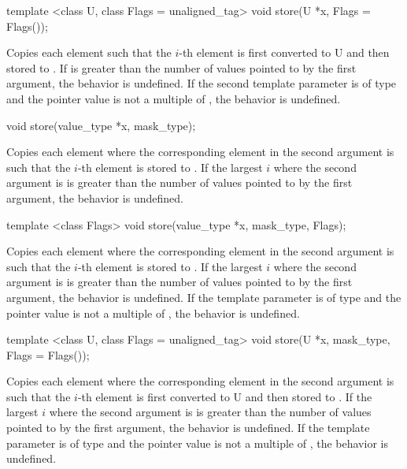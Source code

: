 \begin{wgText}
  \begin{itemdecl}
template <class U, class Flags = unaligned_tag> void store(U *x, Flags = Flags());
  \end{itemdecl}
  \begin{itemdescr}
    \pnum\effects Copies each element such that the $i$-th element is first converted to \type U and then stored to .
    \pnum\remarks If \datapar{} is greater than the number of values pointed to by the first argument, the behavior is undefined.
    \pnum\remarks If the second template parameter is of type  and the pointer value is not a multiple of , the behavior is undefined.
  \end{itemdescr}

  \begin{itemdecl}
void store(value_type *x, mask_type);
  \end{itemdecl}
  \begin{itemdescr}
    \pnum\effects Copies each element where the corresponding element in the second argument is \true such that the $i$-th element is stored to .
    \pnum\remarks If the largest $i$ where the second argument is \true is greater than the number of values pointed to by the first argument, the behavior is undefined.
  \end{itemdescr}

  \begin{itemdecl}
template <class Flags> void store(value_type *x, mask_type, Flags);
  \end{itemdecl}
  \begin{itemdescr}
    \pnum\effects Copies each element where the corresponding element in the second argument is \true such that the $i$-th element is stored to .
    \pnum\remarks If the largest $i$ where the second argument is \true is greater than the number of values pointed to by the first argument, the behavior is undefined.
    \pnum\remarks If the template parameter is of type  and the pointer value is not a multiple of , the behavior is undefined.
  \end{itemdescr}

  \begin{itemdecl}
template <class U, class Flags = unaligned_tag> void store(U *x, mask_type, Flags = Flags());
  \end{itemdecl}
  \begin{itemdescr}
    \pnum\effects Copies each element where the corresponding element in the second argument is \true such that the $i$-th element is first converted to \type U and then stored to .
    \pnum\remarks If the largest $i$ where the second argument is \true is greater than the number of values pointed to by the first argument, the behavior is undefined.
    \pnum\remarks If the template parameter is of type  and the pointer value is not a multiple of , the behavior is undefined.
  \end{itemdescr}


\end{wgText}
